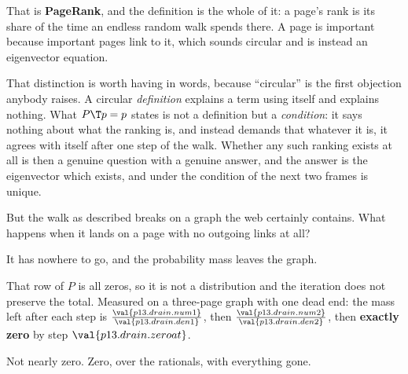\begin{fr}
That is \textbf{PageRank}, and the
definition is the whole of it: a page's
rank is its share of the time an endless random walk spends there. A page is
important because important pages link to it, which sounds circular and is
instead an eigenvector equation.

That distinction is worth having in words, because \enquote{circular} is the
first objection anybody raises. A circular \emph{definition} explains a term
using itself and explains nothing. What $P\T p = p$ states is not a definition
but a \emph{condition}: it says nothing about what the ranking is, and instead
demands that whatever it is, it agrees with itself after one step of the walk.
Whether any such ranking exists at all is then a genuine question with a
genuine answer, and the answer is the eigenvector \dash{} which exists, and
under the condition of the next two frames is unique.

But the walk as described breaks on a graph the web certainly contains. What
happens when it lands on a page with no outgoing links at all?
\dotline
\nextframe
\end{fr}

\begin{fr}
\begin{ansblock}
It has nowhere to go, and the probability mass leaves the graph.
\end{ansblock}

That row of $P$ is all zeros, so it is not a distribution and the iteration
does not preserve the total. Measured on a three-page graph with one dead end:
the mass left after each step is
$\frac{\val{p13.drain.num1}}{\val{p13.drain.den1}}$, then
$\frac{\val{p13.drain.num2}}{\val{p13.drain.den2}}$, then
\textbf{exactly zero} by step $\val{p13.drain.zeroat}$.

Not nearly zero. Zero, over the rationals, with everything gone.
\end{fr}

